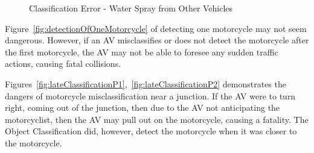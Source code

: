 \documentclass[conference]{IEEEtran}
\begin{document}
\begin{figure}[h]
\begin{minipage}{0.15\textwidth}
			\caption{Classification Error - Water Spray from Other Vehicles}
			\label{fig:detectionOfMotorcycleW3}
		\end{minipage}
	\end{figure}	

    Figure~\ref{fig:detectionOfOneMotorcycle} of detecting one motorcycle may not seem dangerous. However, if an AV misclassifies or does not detect the motorcycle after the first motorcycle, the AV may not be able to foresee any sudden traffic actions, causing fatal collisions.

    Figures~\ref{fig:lateClassificationP1},~\ref{fig:lateClassificationP2} demonstrates the dangers of motorcycle misclassification near a junction. If the AV were to turn right, coming out of the junction, then due to the AV not anticipating the motorcyclist, then the AV may pull out on the motorcycle, causing a fatality. The Object Classification did, however, detect the motorcycle when it was closer to the motorcycle.
\end{document}
